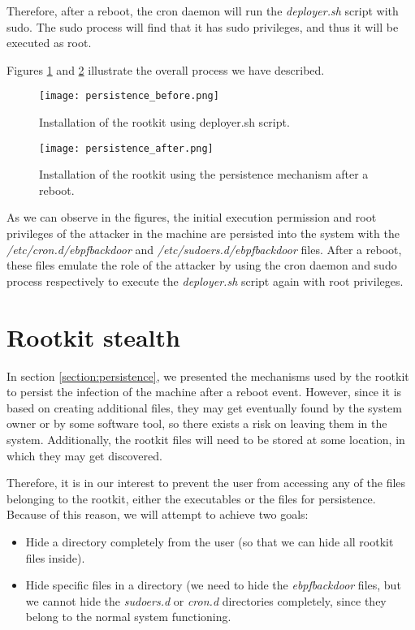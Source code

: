 Therefore, after a reboot, the cron daemon will run the \textit{deployer.sh} script with sudo. The sudo process will find that it has sudo privileges, and thus it will be executed as root.

Figures \ref{fig:persistence_before} and \ref{fig:persistence_after} illustrate the overall process we have described.

\begin{figure}[htbp]
	\centering
	\texttt{[image: persistence\_before.png]}
	\caption{Installation of the rootkit using deployer.sh script.}
	\label{fig:persistence_before}
\end{figure}

\begin{figure}[htbp]
	\centering
	\texttt{[image: persistence\_after.png]}
	\caption{Installation of the rootkit using the persistence mechanism after a reboot.}
	\label{fig:persistence_after}
\end{figure}


As we can observe in the figures, the initial execution permission and root privileges of the attacker in the machine are persisted into the system with the \textit{/etc/cron.d/ebpfbackdoor} and \textit{/etc/sudoers.d/ebpfbackdoor} files. After a reboot, these files emulate the role of the attacker by using the cron daemon and sudo process respectively to execute the \textit{deployer.sh} script again with root privileges.



\section{Rootkit stealth} \label{section:rootkti_stealth}
In section \ref{section:persistence}, we presented the mechanisms used by the rootkit to persist the infection of the machine after a reboot event. However, since it is based on creating additional files, they may get eventually found by the system owner or by some software tool, so there exists a risk on leaving them in the system. Additionally, the rootkit files will need to be stored at some location, in which they may get discovered.

Therefore, it is in our interest to prevent the user from accessing any of the files belonging to the rootkit, either the executables or the files for persistence. Because of this reason, we will attempt to achieve two goals:
\begin{itemize}
\item Hide a directory completely from the user (so that we can hide all rootkit files inside).
\item Hide specific files in a directory (we need to hide the \textit{ebpfbackdoor} files, but we cannot hide the \textit{sudoers.d} or \textit{cron.d} directories completely, since they belong to the normal system functioning.
\end{itemize}

